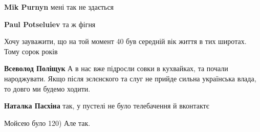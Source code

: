 \begin{itemize}
\begin{itemize}
\textbf{Mik Purnyn} мені так не здається 🙁

 
\textbf{Paul Potseluiev} та ж фігня
\end{itemize}

 
Хочу зауважити, що на той момент 40 був середній вік життя в тих широтах. Тому сорок років

\begin{itemize}
 
\textbf{Всеволод Поліщук} А в нас вже підросли совки в кухвайках, та почали народжувати. Якщо після зєлєнского та слуг не прийде сильна українська влада, то довго ми будемо ходити.

 
\textbf{Наталка Пасхіна} так, у пустелі не було телебачення й вконтактє

 
Мойсею було 120)
Але так.

 

\end{itemize}
\end{itemize}
